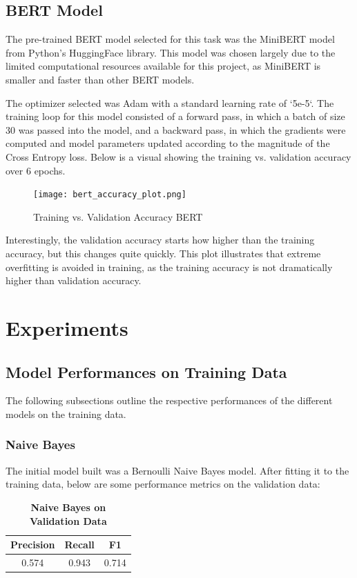 \documentclass[twocolumn]{article}
\begin{document}
\subsection{BERT Model}
The pre-trained BERT model selected for this task was the MiniBERT model from Python's HuggingFace library. This model was chosen largely due to the limited computational resources available for this project, as MiniBERT is smaller and faster than other BERT models. 

The optimizer selected was Adam with a standard learning rate of `5e-5`. The training loop for this model consisted of a forward pass, in which a batch of size 30 was passed into the model, and a backward pass, in which the gradients were computed and model parameters updated according to the magnitude of the Cross Entropy loss. Below is a visual showing the training vs. validation accuracy over 6 epochs.

\begin{figure}[H]
    \centering
    \texttt{[image: bert\_accuracy\_plot.png]}
    \caption{Training vs. Validation Accuracy BERT}
\end{figure}

Interestingly, the validation accuracy starts how higher than the training accuracy, but this changes quite quickly. This plot illustrates that extreme overfitting is avoided in training, as the training accuracy is not dramatically higher than validation accuracy.

\section{Experiments}

\subsection{Model Performances on Training Data}

The following subsections outline the respective performances of the different models on the training data.

\subsubsection{Naive Bayes}
The initial model built was a Bernoulli Naive Bayes model. After fitting it to the training data, below are some performance metrics on the validation data:

\begin{table}[H]
\centering %
\caption{\textbf{Naive Bayes on Validation Data}} 

\begin{tabular}{ccc} 
\toprule
Precision & Recall & F1 \\ 
\midrule
0.574 & 0.943 & 0.714 \\
\bottomrule
\end{tabular}
\end{table}
\end{document}
